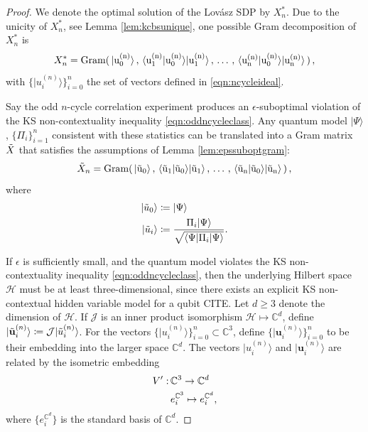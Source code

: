 \begin{proof} We denote the optimal solution of the Lovász SDP by $X^*_n$. Due to the unicity of $X_n^*$, see Lemma \ref{lem:kcbsunique}, one possible Gram decomposition of $X^*_n$ is
\begin{equation*}
X^*_n=\operatorname{Gram(\thinspace\vert u_0^{(n)}\rangle\thinspace,\thinspace \langle u_1^{(n)}\vert u_0^{(n)} \rangle \vert u_1^{(n)}\rangle\thinspace,\thinspace \dots\thinspace,\thinspace \langle u_n^{(n)}\vert u_0^{(n)}\rangle \vert u_n^{(n)}\rangle\thinspace)}\thinspace,
\end{equation*}
with $\{\vert u_i^{(n)} \rangle \}_{i=0}^n$ the set of vectors defined in \ref{eqn:ncycleideal}.

Say the odd $n$-cycle correlation experiment produces an $\epsilon$-suboptimal violation of the KS non-contextuality inequality \ref{eqn:oddncycleclass}. Any quantum model $\vert \Psi \rangle$, $\{\Pi_i\}_{i=1}^n$ consistent with these statistics can be translated into a Gram matrix $\Tilde{X}$ that satisfies the assumptions of Lemma \ref{lem:epssuboptgram}:
\begin{equation*}
\Tilde{X}_n=\operatorname{Gram(\thinspace\vert \Tilde{u}_0\rangle\thinspace,\thinspace \langle \Tilde{u}_1\vert \Tilde{u}_0 \rangle \vert \Tilde{u}_1\rangle\thinspace,\thinspace \dots\thinspace,\thinspace \langle \Tilde{u}_n\vert \Tilde{u}_0\rangle \vert \Tilde{u}_n\rangle\thinspace)}\thinspace,
\end{equation*}
where 
\begin{align*}
    \vert \Tilde{u}_0 \rangle & \coloneqq \vert \Psi \rangle\\
    \vert  \Tilde{u}_i \rangle & \coloneqq \frac{\Pi_i \vert \Psi \rangle}{\sqrt{\langle \Psi \vert \Pi_i \vert \Psi \rangle}}.
\end{align*}

If $\epsilon$ is sufficiently small, and the quantum model violates the KS non-contextuality inequality \ref{eqn:oddncycleclass}, then the underlying Hilbert space $\mathcal{H}$ must be at least three-dimensional, since there exists an explicit KS non-contextual hidden variable model for a qubit CITE. Let $d\geq3$ denote the dimension of $\mathcal{H}$. If $\mathcal{J}$ is an inner product isomorphism $\mathcal{H}\mapsto\mathbb{C}^d$, define $\vert \Tilde{\mathbf{u}}_i^{(n)}\rangle \coloneqq \mathcal{J} \vert \Tilde{u}_i^{(n)}\rangle$.
For the vectors $\{\vert u_i^{(n)}\rangle \}_{i=0}^n\subset\mathbb{C}^3$, define $\{\vert \mathbf{u}_i^{(n)}\rangle \}_{i=0}^n$ to be their embedding into the larger space $\mathbb{C}^d$. The vectors $\vert u_i^{(n)}\rangle$ and $\vert \mathbf{u}_i^{(n)}\rangle$ are related by the isometric embedding 
\begin{align*}
    V':\thinspace & \mathbb{C}^3\rightarrow\mathbb{C}^d \\
    & e_i^{\mathbb{C}^3} \mapsto e_i^{\mathbb{C}^d},
\end{align*}
where $\{e_i^{\mathbb{C}^d}\}$ is the standard basis of $\mathbb{C}^d$.


\end{proof}
